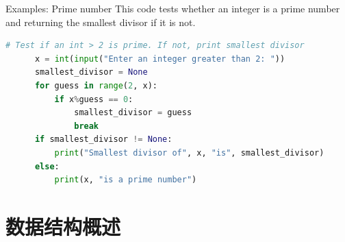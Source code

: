 \documentclass{sintefbeamer}
\begin{document}
\begin{frame}[fragile]{Examples: Prime number}
  This code tests whether an integer is a prime number and returning the smallest divisor if it is not.

  \begin{block}{}
    \begin{lstlisting}[language=Python]
      # Test if an int > 2 is prime. If not, print smallest divisor
      x = int(input("Enter an integer greater than 2: "))
      smallest_divisor = None
      for guess in range(2, x):
          if x%guess == 0:
              smallest_divisor = guess
              break
      if smallest_divisor != None:
          print("Smallest divisor of", x, "is", smallest_divisor)
      else:
          print(x, "is a prime number")
    \end{lstlisting}
  \end{block}
\end{frame}

\section{数据结构概述}

\backmatter
\end{document}
